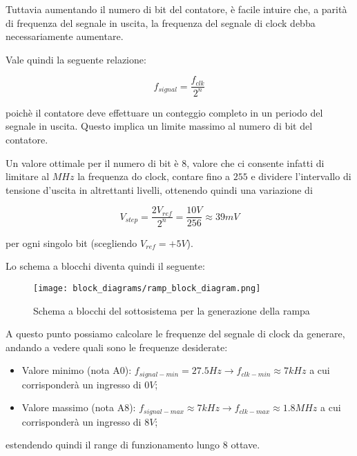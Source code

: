 Tuttavia aumentando il numero di bit del contatore, è facile intuire che, a parità di
frequenza del segnale in uscita, la frequenza del segnale di clock debba necessariamente
aumentare.

Vale quindi la seguente relazione:

\begin{displaymath}
    f_{signal}=\frac{f_{clk}}{2^n}
\end{displaymath}

poichè il contatore deve effettuare un conteggio completo in un periodo del segnale in uscita.
Questo implica un limite massimo al numero di bit del contatore.

Un valore ottimale per il numero di bit è $8$, valore che ci consente infatti di limitare
al $MHz$ la frequenza do clock, contare fino a $255$ e dividere l'intervallo di tensione
d'uscita in altrettanti livelli, ottenendo quindi una variazione di

\begin{displaymath}
    V_{step}=\frac{2V_{ref}}{2^n}=\frac{10V}{256}\approx39mV
\end{displaymath}


per ogni singolo bit (scegliendo $V_{ref}=+5V$).

Lo schema a blocchi diventa quindi il seguente:
\medskip

\begin{figure}[ht]
    \centering
    \texttt{[image: block\_diagrams/ramp\_block\_diagram.png]}
    \caption{Schema a blocchi del sottosistema per la generazione della rampa}
    \label{ramp_block_diagram}
\end{figure}

A questo punto possiamo calcolare le frequenze del segnale di clock da generare,
andando a vedere quali sono le frequenze desiderate:

\begin{itemize}
    \item Valore minimo (nota A0): $f_{signal-min}=27.5Hz\rightarrow f_{clk-min}\approx7kHz$
          a cui corrisponderà un ingresso di $0V$;
    \item Valore massimo (nota A8): $f_{signal-max}\approx7kHz\rightarrow f_{clk-max}\approx1.8MHz$
          a cui corrisponderà un ingresso di $8V$;
\end{itemize}

estendendo quindi il range di funzionamento lungo 8 ottave.


